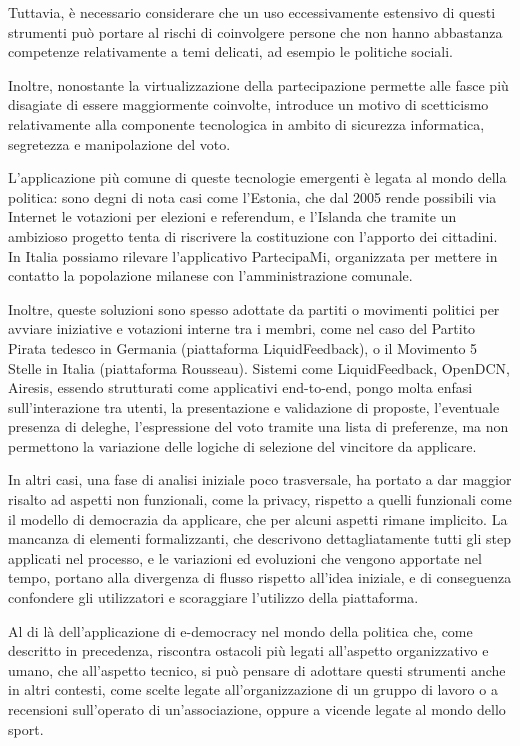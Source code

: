 \documentclass[12pt,a4paper,openright,twoside]{book}
\begin{document}
Tuttavia, è necessario considerare che un uso eccessivamente estensivo di questi strumenti
può portare al rischi di coinvolgere persone che non hanno abbastanza competenze relativamente 
a temi delicati, ad esempio le politiche sociali. 

Inoltre, nonostante la virtualizzazione della partecipazione permette alle fasce più disagiate di essere
maggiormente coinvolte, introduce un motivo di scetticismo relativamente alla componente tecnologica
in ambito di sicurezza informatica, segretezza e manipolazione del voto.

L'applicazione più comune di queste tecnologie emergenti è legata al mondo della politica:
sono degni di nota casi come l'Estonia, che dal 2005 rende possibili via Internet le votazioni
per elezioni e referendum, e l'Islanda che tramite un ambizioso progetto tenta di riscrivere 
la costituzione con l'apporto dei cittadini. In Italia possiamo rilevare l'applicativo PartecipaMi,
organizzata per mettere in contatto la popolazione milanese con l'amministrazione comunale.

Inoltre, queste soluzioni sono spesso adottate da partiti o movimenti politici per avviare iniziative
e votazioni interne tra i membri, come nel caso del Partito Pirata tedesco in Germania (piattaforma LiquidFeedback),
o il Movimento 5 Stelle in Italia (piattaforma Rousseau).
Sistemi come LiquidFeedback, OpenDCN, Airesis, essendo strutturati come applicativi end-to-end,
pongo molta enfasi sull'interazione tra utenti, la presentazione e validazione di proposte,
l'eventuale presenza di deleghe, l'espressione del voto tramite una lista di preferenze, ma
non permettono la variazione delle logiche di selezione del vincitore da applicare\cite{Trapanese:2018}.

In altri casi, una fase di analisi iniziale poco trasversale, ha portato a dar maggior risalto
ad aspetti non funzionali, come la privacy, rispetto a quelli funzionali come il modello di democrazia
da applicare, che per alcuni aspetti rimane implicito. 
La mancanza di elementi formalizzanti, che descrivono dettagliatamente tutti gli step applicati nel
processo, e le variazioni ed evoluzioni che vengono apportate nel tempo, portano alla divergenza di flusso rispetto all'idea iniziale, 
e di conseguenza confondere gli utilizzatori e scoraggiare l'utilizzo della piattaforma\cite{Pianini:2019}.

Al di là dell'applicazione di e-democracy nel mondo della politica che, come descritto in precedenza, riscontra
ostacoli più legati all'aspetto organizzativo e umano, che all'aspetto tecnico, si può pensare di adottare questi strumenti
anche in altri contesti, come scelte legate all'organizzazione di un gruppo di lavoro o a recensioni sull'operato di
un'associazione, oppure a vicende legate al mondo dello sport.
\end{document}
